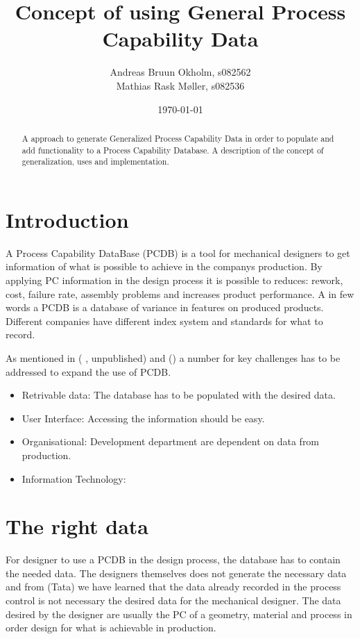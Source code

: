 \documentclass[aip,amsmath, reprint, author-year]{revtex4-1}
\begin{document}
\begin{abstract}
A approach to generate Generalized Process Capability Data in order to populate and add functionality to a Process Capability Database.
A description of the concept of generalization, uses and implementation.
\end{abstract}

\title{Concept of using General Process Capability Data}
\author{Andreas Bruun Okholm, s082562\\
Mathias Rask Møller, s082536 }
 
\date{\today}
\maketitle


\section{Introduction}

A Process Capability DataBase (PCDB)  is a tool for mechanical designers to get information of what is possible to achieve in the companys production. By applying PC information in the design process it is possible to reduces: rework, cost, failure rate, assembly problems and increases product performance.
A in few words a PCDB is a database of variance in features on produced products. Different companies have different index system and standards for what to record. 

As mentioned in (\cite{raskokholm} , unpublished) and (\cite{kern2003forecasting}) a number for key challenges has to be addressed to expand the use of PCDB.
\begin{itemize}
	\item  Retrivable data: The database has to be populated with the desired data.
	\item User Interface: Accessing the information should be easy.
	\item Organisational: Development department are dependent on data from production. 
	\item Information Technology: 
\end{itemize}

\section{The right data}
For designer to use a PCDB in the design process, the database has to contain the needed data. The designers themselves does not generate the necessary data and from (Tata) we have learned that the data already recorded in the process control is not necessary the desired data for the mechanical designer. The data desired by the designer are usually the PC of a geometry, material and process in order design for what is achievable in production. 
\end{document}

